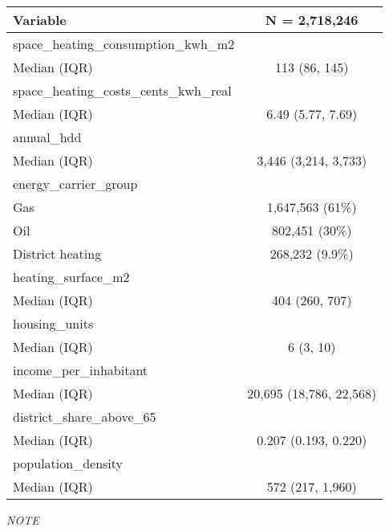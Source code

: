 \captionsetup[table]{labelformat=empty,skip=1pt}
\begin{longtable}{lc}
\toprule
\textbf{Variable} & \textbf{N = 2,718,246} \\ 
\midrule
space\_heating\_consumption\_kwh\_m2 &  \\ 
Median (IQR) & 113 (86, 145) \\ 
space\_heating\_costs\_cents\_kwh\_real &  \\ 
Median (IQR) & 6.49 (5.77, 7.69) \\ 
annual\_hdd &  \\ 
Median (IQR) & 3,446 (3,214, 3,733) \\ 
energy\_carrier\_group &  \\ 
Gas & 1,647,563 (61\%) \\ 
Oil & 802,451 (30\%) \\ 
District heating & 268,232 (9.9\%) \\ 
heating\_surface\_m2 &  \\ 
Median (IQR) & 404 (260, 707) \\ 
housing\_units &  \\ 
Median (IQR) & 6 (3, 10) \\ 
income\_per\_inhabitant &  \\ 
Median (IQR) & 20,695 (18,786, 22,568) \\ 
district\_share\_above\_65 &  \\ 
Median (IQR) & 0.207 (0.193, 0.220) \\ 
population\_density &  \\ 
Median (IQR) & 572 (217, 1,960) \\ 
 \bottomrule
\end{longtable}
\begin{minipage}{\linewidth}
\emph{NOTE}\\ 
\end{minipage}

